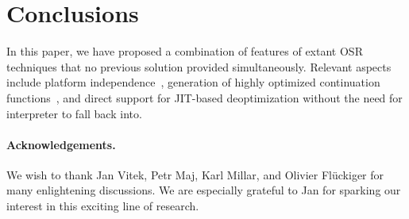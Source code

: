
\section{Conclusions}
\label{se:conclusions}

In this paper, we have proposed a combination of features of extant OSR techniques that no previous solution provided simultaneously. Relevant aspects include platform independence~\cite{lameed2013modular}, generation of highly optimized continuation functions~\cite{fink2003design}, and direct support for JIT-based deoptimization without the need for interpreter to fall back into.



\ifx\noauthorea\undefined
\paragraph{Acknowledgements.}

We wish to thank Jan Vitek, Petr Maj, Karl Millar, and Olivier Fl{\"u}ckiger for many enlightening discussions. We are especially grateful to Jan for sparking our interest in this exciting line of research. %
\fi
